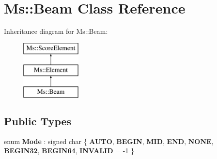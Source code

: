 \hypertarget{class_ms_1_1_beam}{}\section{Ms\+:\+:Beam Class Reference}
\label{class_ms_1_1_beam}
Inheritance diagram for Ms\+:\+:Beam\+:\begin{figure}[H]
\begin{center}
\leavevmode
\includegraphics[height=3.000000cm]{class_ms_1_1_beam}
\end{center}
\end{figure}
\subsection*{Public Types}
\begin{DoxyCompactItemize}
\item 
\mbox{\label{class_ms_1_1_beam_affab6e5059fcaefb7b25c31fd2d0e6fe}} 
enum {\bfseries Mode} \+: signed char \{ \newline
{\bfseries A\+U\+TO}, 
{\bfseries B\+E\+G\+IN}, 
{\bfseries M\+ID}, 
{\bfseries E\+ND}, 
\newline
{\bfseries N\+O\+NE}, 
{\bfseries B\+E\+G\+I\+N32}, 
{\bfseries B\+E\+G\+I\+N64}, 
{\bfseries I\+N\+V\+A\+L\+ID} = -\/1
 \}
\end{DoxyCompactItemize}
